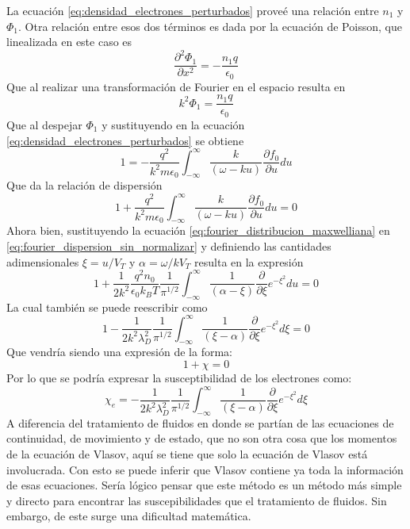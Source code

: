 \documentclass[../tesis_main_file.tex]{subfiles}
\begin{document}
La ecuación \ref{eq:densidad_electrones_perturbados} proveé una relación entre $n_1$ y $\Phi _1$. Otra relación entre esos dos términos es dada por la ecuación de Poisson, que linealizada en este caso es
\begin{equation}
\frac{\partial ^2 \Phi _1}{\partial x^2}=-\frac{n_1 q}{\epsilon _0}
\end{equation}
Que al realizar una transformación de Fourier en el espacio resulta en
\begin{equation}
k^2\Phi_1 = \frac{n_1 q}{\epsilon_0}
\end{equation}
Que al despejar $\Phi_1$ y sustituyendo en la ecuación \ref{eq:densidad_electrones_perturbados} se obtiene
\begin{equation}
1= - \frac{q^2}{k^2 m \epsilon_0}\int^{\infty}_{-\infty} \frac{k}{(\omega -ku)}\frac{\partial f_0}{\partial u}du
\end{equation}
Que da la relación de dispersión
\begin{equation}
\label{eq:fourier_dispersion_sin_normalizar}
1 + \frac{q^2}{k^2 m \epsilon_0}\int^{\infty}_{-\infty} \frac{k}{(\omega -ku)}\frac{\partial f_0}{\partial u}du=0
\end{equation}
Ahora bien, sustituyendo la ecuación \ref{eq:fourier_distribucion_maxwelliana} en \ref{eq:fourier_dispersion_sin_normalizar} y definiendo las cantidades adimensionales $\xi = u/V_T$ y $\alpha= \omega / k V_T$ resulta en la expresión
\begin{equation}
1+\frac{1}{2k^2}\frac{q^2n_0}{\epsilon_0 k_BT}\frac{1}{\pi ^{1/2}}\int^{\infty}_{-\infty}\frac{1}{(\alpha -\xi)}\frac{\partial}{\partial \xi}e^{-\xi ^2}du=0
\end{equation}
La cual también se puede reescribir como 
\begin{equation}
1 - \frac{1}{2k^2 \lambda _D^2}\frac{1}{\pi ^{1/2}}\int^{\infty}_{-\infty}\frac{1}{(\xi -\alpha)}\frac{\partial}{\partial \xi}e^{-\xi ^2}d\xi=0
\end{equation}
Que vendría siendo una expresión de la forma:
\begin{equation}
1 + \chi =0
\end{equation}
Por lo que se podría expresar la susceptibilidad de los electrones como:
\begin{equation}
\label{eq:susceptibilidad_Vlasov_fourier}
\chi_e = -\frac{1}{2k^2 \lambda _D^2}\frac{1}{\pi ^{1/2}}\int^{\infty}_{-\infty}\frac{1}{(\xi -\alpha)}\frac{\partial}{\partial \xi}e^{-\xi ^2}d\xi
\end{equation}
A diferencia del tratamiento de fluidos en donde se partían  de las ecuaciones de continuidad, de movimiento y de estado, que no son otra cosa que los momentos de la ecuación de Vlasov, aquí se tiene que solo la ecuación de Vlasov está involucrada. Con esto se puede inferir que Vlasov contiene ya toda la información de esas ecuaciones. Sería lógico pensar que este método es un método más simple y directo para encontrar las suscepibilidades que el tratamiento de fluidos. Sin embargo, de este surge una dificultad matemática.\\
\end{document}
